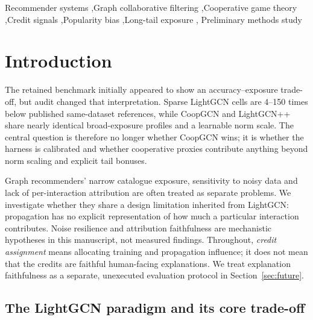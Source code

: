 \documentclass[a4paper,fleqn,longmktitle]{cas-dc}
\begin{document}
\begin{keywords}
Recommender systems \sep Graph collaborative filtering \sep Cooperative game
theory \sep Credit signals \sep Popularity bias \sep Long-tail exposure \sep
Preliminary methods study
\end{keywords}

\maketitle

\section{Introduction}
\label{sec:intro}

The retained benchmark initially appeared to show an accuracy--exposure
trade-off, but audit changed that interpretation. Sparse LightGCN cells are
4--150 times below published same-dataset references, while CoopGCN and
LightGCN++ share nearly identical broad-exposure profiles and a learnable norm
scale. The central question is therefore no longer whether CoopGCN wins; it is
whether the harness is calibrated and whether cooperative proxies contribute
anything beyond norm scaling and explicit tail bonuses.

Graph recommenders' narrow catalogue exposure, sensitivity to noisy data and
lack of per-interaction attribution are often treated as separate problems.
We investigate whether they share a design limitation inherited from
LightGCN: propagation has no explicit representation of how much a particular
interaction contributes. Noise resilience and attribution faithfulness are
mechanistic hypotheses in this manuscript, not measured findings. Throughout,
\emph{credit assignment} means allocating training and propagation influence;
it does not mean that the credits are faithful human-facing explanations. We
treat explanation faithfulness as a separate, unexecuted evaluation protocol
in Section~\ref{sec:future}.

\subsection{The LightGCN paradigm and its core trade-off}
\label{sec:paradigm}
\end{document}
